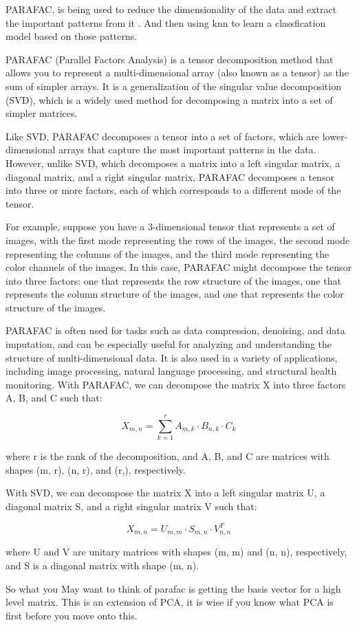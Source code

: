 \documentclass{article}
\theoremstyle{mytheoremstyle}
\theoremstyle{mytheoremstyle}
\theoremstyle{myproblemstyle}
\begin{document}
PARAFAC, is being used to reduce the dimensionality of the data and extract the important patterns from it . And then using knn to learn a classfication model based on those patterns.

\begin{definition}[PARAFAC]
	PARAFAC (Parallel Factors Analysis) is a tensor decomposition method that allows you to represent a multi-dimensional array (also known as a tensor) as the sum of simpler arrays. It is a generalization of the singular value decomposition (SVD), which is a widely used method for decomposing a matrix into a set of simpler matrices.

	Like SVD, PARAFAC decomposes a tensor into a set of factors, which are lower-dimensional arrays that capture the most important patterns in the data. However, unlike SVD, which decomposes a matrix into a left singular matrix, a diagonal matrix, and a right singular matrix, PARAFAC decomposes a tensor into three or more factors, each of which corresponds to a different mode of the tensor.

	For example, suppose you have a 3-dimensional tensor that represents a set of images, with the first mode representing the rows of the images, the second mode representing the columns of the images, and the third mode representing the color channels of the images. In this case, PARAFAC might decompose the tensor into three factors: one that represents the row structure of the images, one that represents the column structure of the images, and one that represents the color structure of the images.

	PARAFAC is often used for tasks such as data compression, denoising, and data imputation, and can be especially useful for analyzing and understanding the structure of multi-dimensional data. It is also used in a variety of applications, including image processing, natural language processing, and structural health monitoring.
	With PARAFAC, we can decompose the matrix X into three factors A, B, and C such that:

	$$X_{m,n} = \sum_{k=1}^r A_{m,k} \cdot B_{n,k} \cdot C_{k}$$

	where r is the rank of the decomposition, and A, B, and C are matrices with shapes (m, r), (n, r), and (r,), respectively.

	With SVD, we can decompose the matrix X into a left singular matrix U, a diagonal matrix S, and a right singular matrix V such that:

	$$X_{m,n} = U_{m,m} \cdot S_{m,n} \cdot V_{n,n}^T$$

	where U and V are unitary matrices with shapes (m, m) and (n, n), respectively, and S is a diagonal matrix with shape (m, n).

	So what you May want to think of parafac is getting the basis vector for a high level matrix. This is an extension of PCA, it is wise if you know what PCA is first before you move onto this.

\end{definition}
\end{document}
